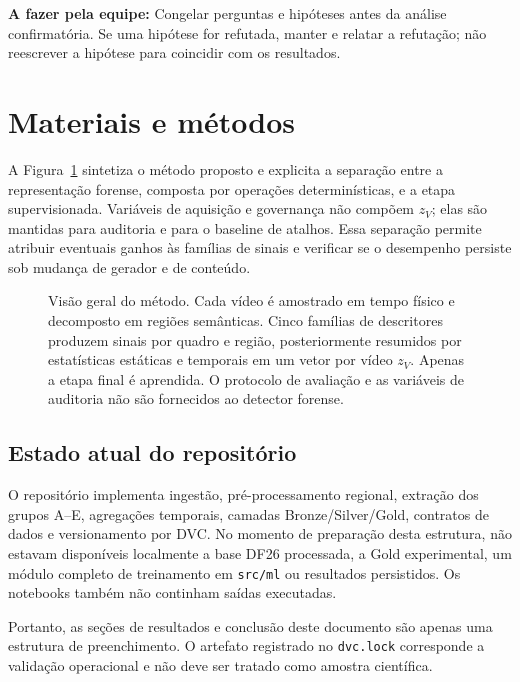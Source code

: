 \documentclass[11pt,a4paper]{article}
\newcommand{\afazer}[1]{%
  \par\smallskip
  \noindent\textcolor{red!70!black}{\textbf{A fazer pela equipe:} #1}
  \par\smallskip
}
\begin{document}
\afazer{Congelar perguntas e hipóteses antes da análise confirmatória. Se uma
hipótese for refutada, manter e relatar a refutação; não reescrever a hipótese
para coincidir com os resultados.}

\section{Materiais e métodos}

A Figura~\ref{fig:visao-geral-metodo} sintetiza o método proposto e explicita
a separação entre a representação forense, composta por operações
determinísticas, e a etapa supervisionada. Variáveis de aquisição e governança
não compõem $z_V$; elas são mantidas para auditoria e para o baseline de
atalhos. Essa separação permite atribuir eventuais ganhos às famílias de sinais
e verificar se o desempenho persiste sob mudança de gerador e de conteúdo.

\begin{figure}[htbp]
  \centering
  \resizebox{\linewidth}{!}{}
  \caption{Visão geral do método. Cada vídeo é amostrado em tempo físico e
  decomposto em regiões semânticas. Cinco famílias de descritores produzem
  sinais por quadro e região, posteriormente resumidos por estatísticas
  estáticas e temporais em um vetor por vídeo $z_V$. Apenas a etapa final é
  aprendida. O protocolo de avaliação e as variáveis de auditoria não são
  fornecidos ao detector forense.}
  \label{fig:visao-geral-metodo}
\end{figure}

\subsection{Estado atual do repositório}

O repositório implementa ingestão, pré-processamento regional, extração dos
grupos A--E, agregações temporais, camadas Bronze/Silver/Gold, contratos de
dados e versionamento por DVC. No momento de preparação desta estrutura, não
estavam disponíveis localmente a base DF26 processada, a Gold experimental, um
módulo completo de treinamento em \texttt{src/ml} ou resultados persistidos.
Os notebooks também não continham saídas executadas.

Portanto, as seções de resultados e conclusão deste documento são apenas uma
estrutura de preenchimento. O artefato registrado no \texttt{dvc.lock}
corresponde a validação operacional e não deve ser tratado como amostra
científica.
\end{document}
